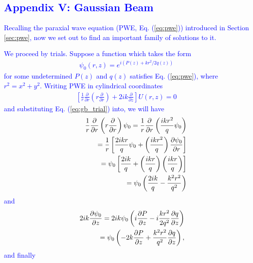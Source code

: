 \textcolor{blue}{
\section*{Appendix V: Gaussian Beam}
Recalling the paraxial wave equation (PWE, Eq. (\ref{eq:pwe})) introduced in Section \ref{sec:pwe}, now we set out to find an important family of solutions to it.}

\textcolor{blue}{
We proceed by trials. Suppose a function which takes the form
\begin{eqnarray}
	\psi_0(r, z) = e^{i (P(z) + kr^2/2q(z))}
	\label{eq:gb_trial}
\end{eqnarray}
for some undetermined $P(z)$ and $q(z)$ satisfies Eq. (\ref{eq:pwe}), where $r^2 = x^2 + y^2$. Writing PWE in cylindrical coordinates
\begin{eqnarray}
	\left[ \frac{1}{r} \frac{\partial}{\partial r} \left( r \frac{\partial}{\partial r}\right) + 2ik \frac{\partial}{\partial z} \right] U(r, z) = 0
\end{eqnarray}
and substituting Eq. (\ref{eq:gb_trial}) into, we will have
\begin{eqnarray}
	&& \frac{1}{r} \frac{\partial}{\partial r} \left( r \frac{\partial}{\partial r}\right) \psi_0
	= \frac{1}{r} \frac{\partial}{\partial r} \left( \frac{ i k r^2}{q} \psi_0 \right)
	\nonumber\\
	&&\hspace{0.5in} = \frac{1}{r} \left[ \frac{2 i k r}{q} \psi_0 + \left( \frac{i k r^2}{q}\right)
	\frac{\partial \psi_0}{\partial r} \right]
	\nonumber\\
	&&\hspace{0.5in} = \psi_0 \left[ \frac{2 i k }{q} 
	+ \left( \frac{i k r}{q} \right) \left( \frac{ i k r}{q} \right) \right]
	\nonumber\\
	&&\hspace{0.5in} = \psi_0 \left( \frac{2 i k }{q} - \frac{k^2 r^2}{q^2} \right) 
	\end{eqnarray}
	and
	\begin{eqnarray}
	&& 2ik \frac{\partial \psi_0}{\partial z} = 2ik \psi_0 \left( i \frac{\partial P}{\partial z}
	- i \frac{k r^2}{2 q^2} \frac{\partial q}{\partial z} \right)
	\nonumber\\
	&&\hspace{0.5in} = \psi_0 \left( -2k \frac{\partial P}{\partial z} + \frac{k^2 r^2}{q^2} 
	\frac{\partial q}{\partial z} \right),
	\end{eqnarray}
	and finally
	\begin{eqnarray}

\end{eqnarray}}
